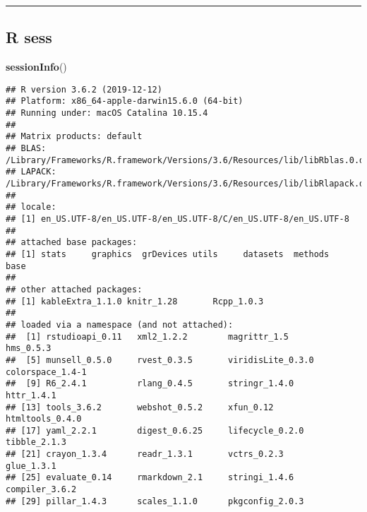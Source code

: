 \documentclass[]{article}
\newenvironment{Shaded}{\begin{snugshade}}{\end{snugshade}}
\newcommand{\KeywordTok}[1]{\textcolor[rgb]{0.13,0.29,0.53}{\textbf{#1}}}
\newcommand{\NormalTok}[1]{#1}
\begin{document}
\begin{center}\rule{0.5\linewidth}{0.5pt}\end{center}

\hypertarget{r-sess}{%
\subsection{R sess}\label{r-sess}}

\begin{Shaded}
\begin{Highlighting}[]
\KeywordTok{sessionInfo}\NormalTok{()}
\end{Highlighting}
\end{Shaded}

\begin{verbatim}
## R version 3.6.2 (2019-12-12)
## Platform: x86_64-apple-darwin15.6.0 (64-bit)
## Running under: macOS Catalina 10.15.4
## 
## Matrix products: default
## BLAS:   /Library/Frameworks/R.framework/Versions/3.6/Resources/lib/libRblas.0.dylib
## LAPACK: /Library/Frameworks/R.framework/Versions/3.6/Resources/lib/libRlapack.dylib
## 
## locale:
## [1] en_US.UTF-8/en_US.UTF-8/en_US.UTF-8/C/en_US.UTF-8/en_US.UTF-8
## 
## attached base packages:
## [1] stats     graphics  grDevices utils     datasets  methods   base     
## 
## other attached packages:
## [1] kableExtra_1.1.0 knitr_1.28       Rcpp_1.0.3      
## 
## loaded via a namespace (and not attached):
##  [1] rstudioapi_0.11   xml2_1.2.2        magrittr_1.5      hms_0.5.3        
##  [5] munsell_0.5.0     rvest_0.3.5       viridisLite_0.3.0 colorspace_1.4-1 
##  [9] R6_2.4.1          rlang_0.4.5       stringr_1.4.0     httr_1.4.1       
## [13] tools_3.6.2       webshot_0.5.2     xfun_0.12         htmltools_0.4.0  
## [17] yaml_2.2.1        digest_0.6.25     lifecycle_0.2.0   tibble_2.1.3     
## [21] crayon_1.3.4      readr_1.3.1       vctrs_0.2.3       glue_1.3.1       
## [25] evaluate_0.14     rmarkdown_2.1     stringi_1.4.6     compiler_3.6.2   
## [29] pillar_1.4.3      scales_1.1.0      pkgconfig_2.0.3
\end{verbatim}
\end{document}
